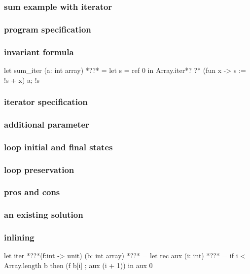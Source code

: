 \begin{frame}[fragile]
\frametitle<1>{sum example with {iterator}}
\frametitle<2>{program specification}
\frametitle<3>{invariant formula}
\begin{whycode}
 let sum_iter (a: int array) *??* 
 = let s = ref 0 in
   Array.iter*?
   ?* 
       (fun x ->  s := !s + x) a; 
     !s 
\end{whycode}
\end{frame}

\begin{frame}[fragile]
\frametitle<1>{iterator specification}
\frametitle<2>{additional parameter}
\frametitle<3>{loop initial and final states}
\frametitle<4>{loop preservation}
\frametitle<5-6>{pros and cons}
\frametitle<7>{an existing solution}
\frametitle<8>{inlining}
\begin{whycode}  
let iter *??*(f:int -> unit) (b: int array) *??* 
= let rec aux (i: int) *??*  
  = if i < Array.length b 
    then (f b[i] ; aux (i + 1)) 
  in aux 0
\end{whycode} 
\bigskip
{}
\end{frame}



